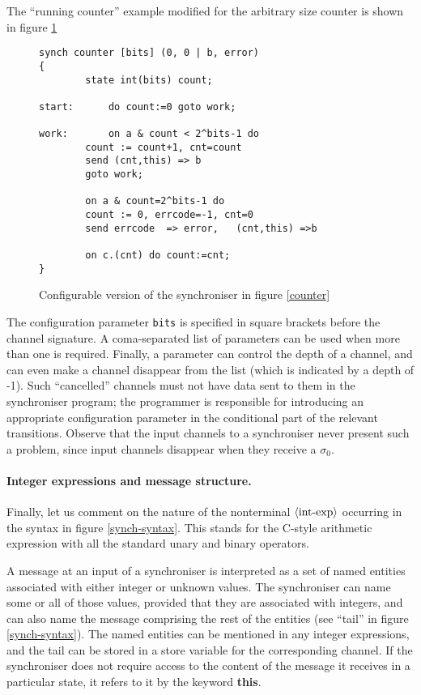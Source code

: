 \documentclass[11pt]{report}
\begin{document}
The ``running counter'' example modified for the arbitrary size counter is shown in figure \ref{cnt1}

\begin{figure}
\begin{lstlisting}[frame=single]
synch counter [bits] (0, 0 | b, error)
{
		state int(bits) count;

start:		do count:=0 goto work;

work: 		on a & count < 2^bits-1 do
		count := count+1, cnt=count
		send (cnt,this) => b
		goto work;
		
		on a & count=2^bits-1 do
		count := 0, errcode=-1, cnt=0
		send errcode  => error,   (cnt,this) =>b
		
		on c.(cnt) do count:=cnt;
}
\end{lstlisting}
\caption{Configurable version of the synchroniser in figure \ref{counter}\label{cnt1}}
\end{figure}
The configuration parameter \verb$bits$ is specified in square brackets before the channel signature.
A coma-separated list of parameters can be used when more than one is required. Finally, a parameter can control the depth of a channel, and can even make a channel disappear from the list (which is indicated by a depth of -1). Such ``cancelled'' channels must not have data sent to them in the synchroniser program; the programmer is responsible for introducing an appropriate configuration parameter in the conditional part of the relevant transitions. Observe that the input channels to a synchroniser never present such a problem, since input channels disappear when they receive a $\sigma_0$.

\paragraph{Integer expressions and message structure.} Finally, let us comment on the nature of the nonterminal $\langle\hbox{int-exp}\rangle$ occurring in the syntax in figure \ref{synch-syntax}. This stands for the C-style arithmetic expression with all the standard unary and binary operators.

A message at an input of a synchroniser is interpreted as a set of named entities associated with either integer or unknown values. The synchroniser can name some or all of those values, provided that they are associated with integers, and can also name the message comprising the rest of the entities (see ``tail'' in figure \ref{synch-syntax}). The named entities can be mentioned in any integer expressions, and the tail can be stored in a store variable for the corresponding channel. If the synchroniser does not require access to the content of the message it receives in a particular state, it refers to it by the keyword {\bf this}.
\end{document}
